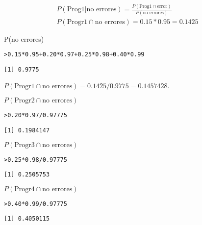 \documentclass{article}\usepackage[]{graphicx}\usepackage[]{color}
\makeatletter
\newcommand{\hlnum}[1]{\textcolor[rgb]{0.686,0.059,0.569}{#1}}%
\newcommand{\hlopt}[1]{\textcolor[rgb]{0,0,0}{#1}}%
\newcommand{\hlstd}[1]{\textcolor[rgb]{0.345,0.345,0.345}{#1}}%
\newenvironment{kframe}{%
 \def\at@end@of@kframe{}%
 \ifinner\ifhmode%
  \def\at@end@of@kframe{\end{minipage}}%
  \begin{minipage}{\columnwidth}%
 \fi\fi%
 \def\FrameCommand##1{\hskip\@totalleftmargin \hskip-\fboxsep
 \colorbox{shadecolor}{##1}\hskip-\fboxsep
     \hskip-\linewidth \hskip-\@totalleftmargin \hskip\columnwidth}%
 \MakeFramed {\advance\hsize-\width
   \@totalleftmargin\z@ \linewidth\hsize
   \@setminipage}}%
 {\par\unskip\endMakeFramed%
 \at@end@of@kframe}
\newenvironment{knitrout}{}{} %
\makeatother
\begin{document}
\begin{align*}
P(\mbox{Prog1|no errores}) = \frac{P(\mbox{Prog1} \cap \mbox{error})}{P(\mbox{no errores})}\\
P(\mbox{Progr1} \cap \mbox{no errores}) = 0.15 *0.95 = 0.1425
\end{align*}

P(no errores)

\begin{knitrout}
\color{fgcolor}\begin{kframe}
\begin{alltt}
\hlstd{> }\hlnum{0.15}\hlopt{*}\hlnum{0.95} \hlopt{+} \hlnum{0.20} \hlopt{*}\hlnum{0.97} \hlopt{+} \hlnum{0.25} \hlopt{*} \hlnum{0.98} \hlopt{+} \hlnum{0.40} \hlopt{*} \hlnum{0.99}
\end{alltt}
\begin{verbatim}
[1] 0.9775
\end{verbatim}
\end{kframe}
\end{knitrout}

$P(\mbox{Progr1} \cap \mbox{no errores}) = 0.1425/0.9775 = 0.1457428$.

$P(\mbox{Progr2} \cap \mbox{no errores})$

\begin{knitrout}
\color{fgcolor}\begin{kframe}
\begin{alltt}
\hlstd{> }\hlnum{0.20}\hlopt{*}\hlnum{0.97}\hlopt{/}\hlnum{0.97775}
\end{alltt}
\begin{verbatim}
[1] 0.1984147
\end{verbatim}
\end{kframe}
\end{knitrout}

$P(\mbox{Progr3} \cap \mbox{no errores})$

\begin{knitrout}
\color{fgcolor}\begin{kframe}
\begin{alltt}
\hlstd{> }\hlnum{0.25}\hlopt{*}\hlnum{0.98}\hlopt{/}\hlnum{0.97775}
\end{alltt}
\begin{verbatim}
[1] 0.2505753
\end{verbatim}
\end{kframe}
\end{knitrout}
$P(\mbox{Progr4} \cap \mbox{no errores})$
\begin{knitrout}
\color{fgcolor}\begin{kframe}
\begin{alltt}
\hlstd{> }\hlnum{0.40}\hlopt{*}\hlnum{0.99}\hlopt{/}\hlnum{0.97775}
\end{alltt}
\begin{verbatim}
[1] 0.4050115
\end{verbatim}
\end{kframe}
\end{knitrout}
\vspace{0.8cm}
\end{document}
